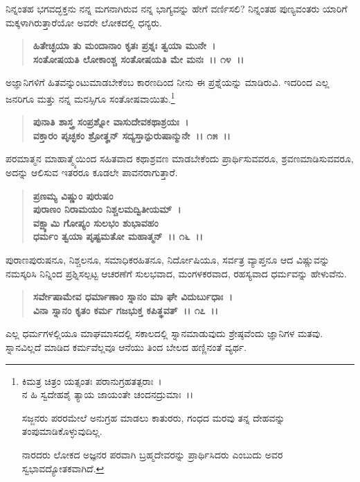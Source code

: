 ನಿನ್ನಂತಹ ಭಗವದ್ಭಕ್ತನು ನನ್ನ ಮಗನಾಗಿರುವ ನನ್ನ ಭಾಗ್ಯವನ್ನು ಹೇಗೆ ವರ್ಣಿಸಲಿ? ನಿನ್ನಂತಹ ಪುಣ್ಯವಂತರು ಯಾರಿಗೆ ಮಕ್ಕಳಾಗಿರುತ್ತಾರೆಯೋ ಅವರೇ ಲೋಕದಲ್ಲಿ ಧನ್ಯರು.

\begin{verse}
\textbf{ಹಿತೇಚ್ಛಯಾ ತು ಮಂದಾನಾಂ ಕೃತಃ ಪ್ರಶ್ನಃ ತ್ವಯಾ ಮುನೇ~।}\\\textbf{ಸಂತೋಷಯತಿ ಲೋಕಾಂಶ್ಚ ಸಂತೋಷಯತಿ ಮೇ ಮನಃ~।। ೧೪~।।}
\end{verse}

ಅಜ್ಞಾನಿಗಳಿಗೆ ಹಿತವನ್ನುಂಟುಮಾಡಬೇಕೆಂಬ ಕಾರಣದಿಂದ ನೀನು ಈ ಪ್ರಶ್ನೆಯನ್ನು ಮಾಡಿರುವಿ. ಇದರಿಂದ ಎಲ್ಲ ಜನರಿಗೂ ಮತ್ತು ನನ್ನ ಮನಸ್ಸಿಗೂ ಸಂತೋಷವಾಯಿತು.\footnote{\phantom{*} ಕಿಮತ್ರ ಚಿತ್ರಂ ಯತ್ಸಂತಃ ಪರಾನುಗ್ರಹತತ್ಪರಾಃ~।\\ ನ ಹಿ ಸ್ವದೇಹಶೈ ತ್ಯಾಯ ಜಾಯಂತೇ ಚಂದನದ್ರುಮಾಃ~।।

ಸಜ್ಜನರು ಪರರಮೇಲೆ ಅನುಗ್ರಹ ಮಾಡಲು ಕಾತುರರು, ಗಂಧದ ಮರವು ತನ್ನ ದೇಹವನ್ನು ತಂಪುಮಾಡಿಕೊಳ್ಳುವು\-ದಿಲ್ಲ.

ನಾರದರು ಲೋಕದ ಅಜ್ಞನರ ಪರವಾಗಿ ಬ್ರಹ್ಮದೇವರನ್ನು ಪ್ರಾರ್ಥಿಸಿದರು ಎಂಬುದು ಅವರ ಸ್ವಭಾವದ್ಯೋತಕ\-ವಾಗಿದೆ.}

\begin{verse}
\textbf{ಪುನಾತಿ ಶಾಸ್ತ್ರ ಸಂಪ್ರಶ್ನೋ ವಾಸುದೇವಕಥಾಶ್ರಯಃ~।}\\\textbf{ವಕ್ತಾರಂ ಪೃಚ್ಛಕಂ ಶ್ರೋತೄನ್ ಸದ್ಯಸ್ತಾನ್ಪುರುಷಾನ್ಮುನೇ~।। ೧೫~।।}
\end{verse}

ಪರಮಾತ್ಮನ ಮಾಹಾತ್ಮ್ಯೆಯಿಂದ ಸಹಿತವಾದ ಕಥಾಶ್ರವಣ ಮಾಡಬೇಕೆಂದು ಪ್ರಾರ್ಥಿಸು\-ವವರೂ, ಶ್ರವಣಮಾಡಿಸುವವರೂ, ಅದನ್ನು ಆಲಿಸುವ ಇತರರೂ ಕೂಡಲೇ ಪಾವನ\-ರಾಗುತ್ತಾರೆ.

\begin{verse}
\textbf{ಪ್ರಣಮ್ಯ ವಿಷ್ಣುಂ ಪುರುಷಂ} \\\textbf{ಪುರಾಣಂ ನಿರಾಮಯಂ ನಿಶ್ಚಲಮದ್ವಿತೀಯಮ್~।}\\\textbf{ವಕ್ಷ್ಯಾಮಿ ಗೋಪ್ಯಂ ಸುಲಭಂ ಶುಭಾವಹಂ}\\\textbf{ಧರ್ಮಂ ತ್ವಯಾ ಪೃಷ್ಟಮತೋ ಮಹಾತ್ಮನ್~।। ೧೬~।।}
\end{verse}

ಪುರಾಣಪುರುಷನೂ, ನಿಶ್ಚಲನೂ, ಸಮಾಧಿಕರಹಿತನೂ, ನಿರ್ದೋಷಿಯೂ, ಸರ್ವತ್ರ ವ್ಯಾಪ್ತನೂ ಆದ ವಿಷ್ಣುವನ್ನು ನಮಸ್ಕರಿಸಿ ನಿನ್ನಿಂದ ಪ್ರಶ್ನಿಸಲ್ಪಟ್ಟ ಆಚರಣೆಗೆ ಸುಲಭವಾದ, ಮಂಗಳಕರವಾದ, ರಹಸ್ಯವಾದ ಧರ್ಮವನ್ನು ಹೇಳುವೆನು.

\begin{verse}
\textbf{ಸರ್ವೇಷಾಮೇವ ಧರ್ಮಾಣಾಂ ಸ್ನಾನಂ ಮಾ ಘೇ ವಿದುರ್ಬುಧಾಃ~।}\\\textbf{ವಿನಾ ಸ್ನಾನಂ ಕೃತಂ ಕರ್ಮ ಗಜಭುಕ್ತ ಕಪಿತ್ಥವತ್~।। ೧೭~।।}
\end{verse}

ಎಲ್ಲ ಧರ್ಮಗಳಲ್ಲಿಯೂ ಮಾಘಮಾಸದಲ್ಲಿ ಸಕಾಲದಲ್ಲಿ ಸ್ನಾನಮಾಡುವುದು ಶ್ರೇಷ್ಠವೆಂದು ಜ್ಞಾನಿಗಳ ಮತವು. ಸ್ನಾನವಿಲ್ಲದೆ ಮಾಡಿದ ಕರ್ಮವೆಲ್ಲವೂ ಆನೆಯು ತಿಂದ ಬೇಲದ ಹಣ್ಣಿನಂತೆ ವ್ಯರ್ಥ.

